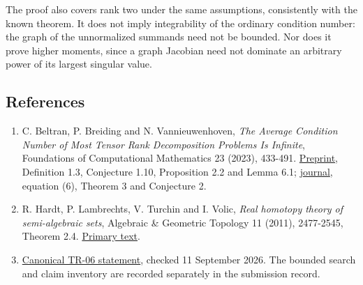 \documentclass[
  11pt,
]{article}
\providecommand{\tightlist}{%
  \setlength{\itemsep}{0pt}\setlength{\parskip}{0pt}}
\begin{document}
The proof also covers rank two under the same assumptions, consistently
with the known theorem. It does not imply integrability of the ordinary
condition number: the graph of the unnormalized summands need not be
bounded. Nor does it prove higher moments, since a graph Jacobian need
not dominate an arbitrary power of its largest singular value.

\subsection{References}\label{references}

\begin{enumerate}
\def\labelenumi{\arabic{enumi}.}
\tightlist
\item
  C. Beltran, P. Breiding and N. Vannieuwenhoven, \emph{The Average
  Condition Number of Most Tensor Rank Decomposition Problems Is
  Infinite}, Foundations of Computational Mathematics 23 (2023),
  433-491. \href{https://arxiv.org/abs/1903.05527}{Preprint}, Definition
  1.3, Conjecture 1.10, Proposition 2.2 and Lemma 6.1;
  \href{https://doi.org/10.1007/s10208-022-09551-1}{journal}, equation
  (6), Theorem 3 and Conjecture 2.
\item
  R. Hardt, P. Lambrechts, V. Turchin and I. Volic, \emph{Real homotopy
  theory of semi-algebraic sets}, Algebraic \& Geometric Topology 11
  (2011), 2477-2545, Theorem 2.4.
  \href{https://msp.org/agt/2011/11-5/agt-v11-n5-p01-s.pdf}{Primary
  text}.
\item
  \href{https://github.com/ajt60gaibb/OpenProblemsInNLA/blob/main/tensor-computations/TR-06/README.md}{Canonical
  TR-06 statement}, checked 11 September 2026. The bounded search and
  claim inventory are recorded separately in the submission record.
\end{enumerate}
\end{document}
